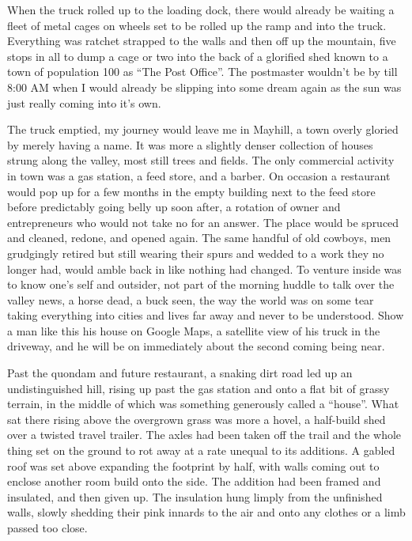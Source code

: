 \documentclass[ebook, 10pt, openright, onecolumn]{memoir}
\begin{document}
When the truck rolled up to the loading dock, there would already be waiting a
fleet of metal cages on wheels set to be rolled up the ramp and into the truck.
Everything was ratchet strapped to the walls and then off up the mountain, five
stops in all to dump a cage or two into the back of a glorified shed known to a
town of population 100 as ``The Post Office''.  The postmaster wouldn't be by
till 8:00 AM when I would already be slipping into some dream again as the sun
was just really coming into it's own.

The truck emptied, my journey would leave me in Mayhill, a town overly gloried
by merely having a name.  It was more a slightly denser collection of houses
strung along the valley, most still trees and fields.  The only commercial
activity in town was a gas station, a feed store, and a barber.  On occasion a
restaurant would pop up for a few months in the empty building next to the feed
store before predictably going belly up soon after, a rotation of owner and
entrepreneurs who would not take no for an answer.  The place would be spruced
and cleaned, redone, and opened again.  The same handful of old cowboys, men
grudgingly retired but still wearing their spurs and wedded to a work they no
longer had, would amble back in like nothing had changed.  To venture inside was
to know one's self and outsider, not part of the morning huddle to talk over the
valley news, a horse dead, a buck seen, the way the world was on some tear
taking everything into cities and lives far away and never to be understood.
Show a man like this his house on Google Maps, a satellite view of his truck in
the driveway, and he will be on immediately about the second coming being near.

Past the quondam and future restaurant, a snaking dirt road led up an
undistinguished hill, rising up past the gas station and onto a flat bit of
grassy terrain, in the middle of which was something generously called a
``house''. What sat there rising above the overgrown grass was more a hovel, a
half-build shed over a twisted travel trailer.  The axles had been taken off the
trail and the whole thing set on the ground to rot away at a rate unequal to its
additions.  A gabled roof was set above expanding the footprint by half, with
walls coming out to enclose another room build onto the side.  The addition had
been framed and insulated, and then given up.  The insulation hung limply from
the unfinished walls, slowly shedding their pink innards to the air and onto any
clothes or a limb passed too close.
\end{document}
